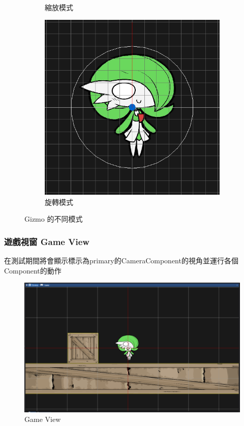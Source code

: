 \begin{figure}[h]
\begin{center}
\begin{subfigure}[h]{0.24\linewidth}
        \caption{縮放模式}
    \end{subfigure}
    \begin{subfigure}[h]{0.24\linewidth}
        \includegraphics[width=\linewidth]{./resources/editor/gizmo_d.png}
        \caption{旋轉模式}
    \end{subfigure}
    \end{center}
\caption{Gizmo 的不同模式}
\label{fig:Gizmo}
\end{figure}

\subsubsection{遊戲視窗 Game View}

在測試期間將會顯示標示為primary的CameraComponent的視角並運行各個Component的動作

\begin{figure}[h]
    \begin{center}
    \includegraphics[width=0.6\linewidth]{./resources/editor/sceneView.png}
    \end{center}
\caption{Game View}
\label{gameView}
\end{figure}

